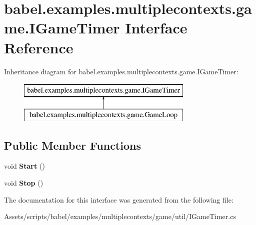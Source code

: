 \hypertarget{interfacebabel_1_1examples_1_1multiplecontexts_1_1game_1_1_i_game_timer}{\section{babel.\-examples.\-multiplecontexts.\-game.\-I\-Game\-Timer Interface Reference}
\label{interfacebabel_1_1examples_1_1multiplecontexts_1_1game_1_1_i_game_timer}
}
Inheritance diagram for babel.\-examples.\-multiplecontexts.\-game.\-I\-Game\-Timer\-:\begin{figure}[H]
\begin{center}
\leavevmode
\includegraphics[height=2.000000cm]{interfacebabel_1_1examples_1_1multiplecontexts_1_1game_1_1_i_game_timer}
\end{center}
\end{figure}
\subsection*{Public Member Functions}
\begin{DoxyCompactItemize}
\item 
\hypertarget{interfacebabel_1_1examples_1_1multiplecontexts_1_1game_1_1_i_game_timer_a46f75700d7a966a9e176655780a23ddf}{void {\bfseries Start} ()}\label{interfacebabel_1_1examples_1_1multiplecontexts_1_1game_1_1_i_game_timer_a46f75700d7a966a9e176655780a23ddf}

\item 
\hypertarget{interfacebabel_1_1examples_1_1multiplecontexts_1_1game_1_1_i_game_timer_abcfff36211863edd49819e74fb187ad7}{void {\bfseries Stop} ()}\label{interfacebabel_1_1examples_1_1multiplecontexts_1_1game_1_1_i_game_timer_abcfff36211863edd49819e74fb187ad7}

\end{DoxyCompactItemize}


The documentation for this interface was generated from the following file\-:\begin{DoxyCompactItemize}
\item 
Assets/scripts/babel/examples/multiplecontexts/game/util/I\-Game\-Timer.\-cs\end{DoxyCompactItemize}
